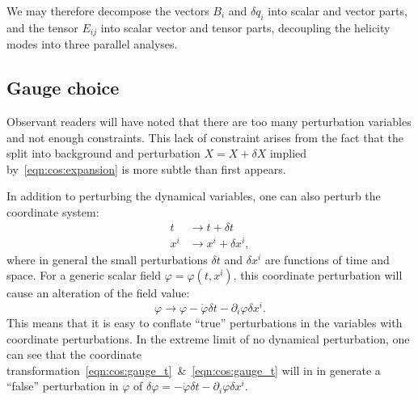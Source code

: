 We may therefore decompose the vectors $B_i$ and $\delta q_i$ into scalar and vector parts, and the tensor $E_{ij}$ into scalar vector and tensor parts, decoupling the helicity modes into three parallel analyses.

\subsection{Gauge choice}
Observant readers will have noted that there are too many perturbation variables and not enough constraints.
This lack of constraint arises from the fact that the split into background and perturbation $X=X+\delta X$ implied by~\eqref{eqn:cos:expansion} is more subtle than first appears. 

In addition to perturbing the dynamical variables, one can also perturb the coordinate system:
\begin{align}
  t &\rightarrow t + \delta t  
  \label{eqn:cos:gauge_t}
  \\
  x^i &\rightarrow x^i  + \delta x^i ,
  \label{eqn:cos:gauge_x}
\end{align}
where in general the small perturbations $\delta t$ and $\delta x^i$ are functions of time and space.
For a generic scalar field $\varphi = \varphi(t,x^i)$, this coordinate perturbation will cause an alteration of the field value:
\begin{equation}
  \varphi \rightarrow \varphi - \dot{\varphi}\delta t - \partial_i\varphi\delta x^i.
\end{equation}
This means that it is easy to conflate ``true'' perturbations in the variables with coordinate perturbations. In the extreme limit of no dynamical perturbation, one can see that the coordinate transformation~\eqref{eqn:cos:gauge_t}~\&~\eqref{eqn:cos:gauge_t} will in in generate a ``false'' perturbation in $\varphi$ of $\delta\varphi = -\dot{\varphi}\delta t - \partial_i\varphi\delta x^i$.

